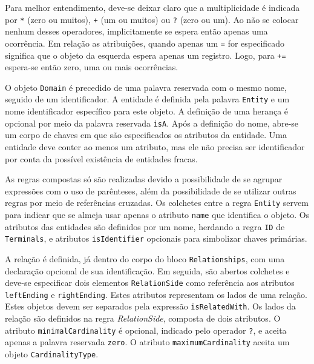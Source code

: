 Para melhor entendimento, deve-se deixar claro que a multiplicidade é indicada por \texttt{*} (zero ou muitos), \texttt{+} (um ou muitos) ou \texttt{?} (zero ou um). 
Ao não se colocar nenhum desses operadores, implicitamente se espera então apenas uma ocorrência. 
Em relação as atribuições, quando apenas um \texttt{=} for especificado significa que o objeto da esquerda espera apenas um registro. 
Logo, para \texttt{+=} espera-se então zero, uma ou mais ocorrências. 

O objeto \texttt{Domain} é precedido de uma palavra reservada com o mesmo nome, seguido de um identificador. 
A entidade é definida pela palavra \texttt{Entity} e um nome identificador específico para este objeto. 
A definição de uma herança é opcional por meio da palavra reservada \texttt{isA}. 
Após a definição do nome, abre-se um corpo de chaves em que são especificados os atributos da entidade. 
Uma entidade deve conter ao menos um atributo, mas ele não precisa ser identificador por conta da possível existência de entidades fracas. 

As regras compostas só são realizadas devido a possibilidade de se agrupar expressões com o uso de parênteses, além da possibilidade de se utilizar outras regras por meio de referências cruzadas. 
Os colchetes entre a regra \texttt{Entity} servem para indicar que se almeja usar apenas o atributo \texttt{name} que identifica o objeto. 
Os atributos das entidades são definidos por um nome, herdando a regra \texttt{ID} de \texttt{Terminals}, e atributos \texttt{isIdentifier} opcionais para simbolizar chaves primárias. 

A relação é definida, já dentro do corpo do bloco \texttt{Relationships}, com uma declaração opcional de sua identificação. 
Em seguida, são abertos colchetes e deve-se especificar dois elementos \texttt{RelationSide} como referência aos atributos \texttt{leftEnding} e \texttt{rightEnding}. 
Estes atributos representam os lados de uma relação. 
Estes objetos devem ser separados pela expressão \texttt{isRelatedWith}. 
Os lados da relação são definidos na regra \textit{RelationSide}, composta de dois atributos. 
O atributo \texttt{minimalCardinality} é opcional, indicado pelo operador \texttt{?}, e aceita apenas a palavra reservada \texttt{zero}. 
O atributo \texttt{maximumCardinality} aceita um objeto \texttt{CardinalityType}.

